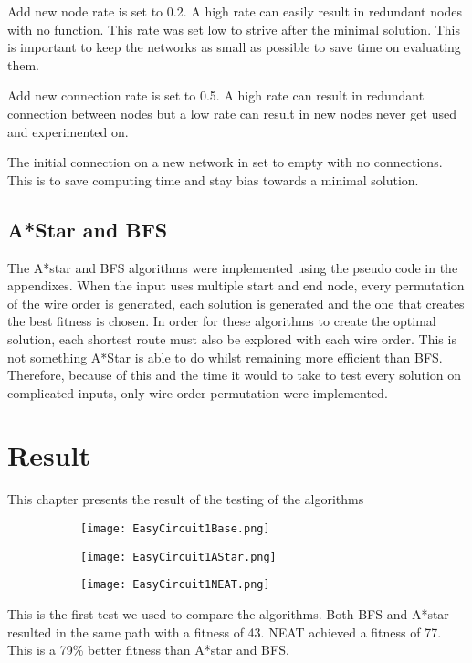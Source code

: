 \documentclass{kththesis}
\begin{document}
Add new node rate is set to 0.2. A high rate can easily result in redundant nodes with no function. This rate was set low to strive after the minimal solution. This is important to keep the networks as small as possible to save time on evaluating them. 

Add new connection rate is set to 0.5. A high rate can result in redundant connection between nodes but a low rate can result in new nodes never get used and experimented on.

The initial connection on a new network in set to empty with no connections. This is to save computing time and stay bias towards a minimal solution.






\section{A*Star and BFS}
The A*star and BFS algorithms were implemented using the pseudo code in the appendixes. When the input uses multiple start and end node, every permutation of the wire order is generated, each solution is generated and the one that creates the best fitness is chosen. In order for these algorithms to create the optimal solution, each shortest route must also be explored with each wire order. This is not something A*Star is able to do whilst remaining more efficient than BFS. Therefore, because of this and the time it would to take to test every solution on complicated inputs, only wire order permutation were implemented.


\chapter{Result}
This chapter presents the result of the testing of the algorithms
\begin{figure}[h]
\begin{subfigure}{0.3\textwidth}
\texttt{[image: EasyCircuit1Base.png]}
\end{subfigure}
\begin{subfigure}{0.3\textwidth}
\texttt{[image: EasyCircuit1AStar.png]}
\end{subfigure}
\begin{subfigure}{0.3\textwidth}
\texttt{[image: EasyCircuit1NEAT.png]}
\end{subfigure}
\end{figure}
This is the first test we used to compare the algorithms. Both BFS and A*star resulted in the same path with a fitness of 43. NEAT achieved a fitness of 77. This is a 79\% better fitness than A*star and BFS.
\end{document}
